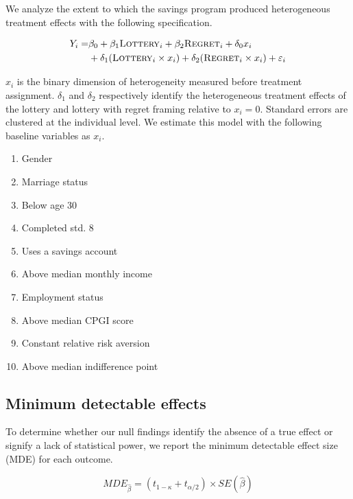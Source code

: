 \documentclass[12pt]{article}
\begin{document}
		We analyze the extent to which the savings program produced heterogeneous treatment effects with the following specification.

		\begin{equation} \begin{split}
		Y_{i} = & \beta_{0} + \beta_{1}\text{\textsc{Lottery}}_{i} + \beta_{2}\text{\textsc{Regret}}_{i} + \delta_{0}x_{i} \\
					& + \delta_{1}(\text{\textsc{Lottery}}_{i} \times x_{i}) + \delta_{2}(\text{\textsc{Regret}}_{i} \times x_{i}) + \varepsilon_{i}
		\end{split} \label{eq:heteffect} \end{equation}

		$x_{i}$ is the binary dimension of heterogeneity measured before treatment assignment. $\delta_{1}$ and $\delta_{2}$ respectively identify the heterogeneous treatment effects of the lottery and lottery with regret framing relative to $x_{i} = 0$. Standard errors are clustered at the individual level. We estimate this model with the following baseline variables as $x_{i}$.

			\begin{enumerate}
			\item Gender
			\item Marriage status
			\item Below age 30
			\item Completed std. 8
			\item Uses a savings account
			\item Above median monthly income
			\item Employment status
			\item Above median CPGI score
			\item Constant relative risk aversion
			\item Above median indifference point
			\end{enumerate}

	\subsection{Minimum detectable effects}

		To determine whether our null findings identify the absence of a true effect or signify a lack of statistical power, we report the minimum detectable effect size (MDE) for each outcome.

		\begin{equation}
			MDE_{\hat \beta} = (t_{1-\kappa} + t_{\alpha/2}) \times SE(\hat \beta)
		\label{eq:mde} \end{equation}
\end{document}
